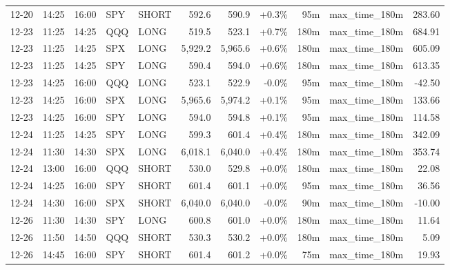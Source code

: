 \documentclass[11pt,a4paper,twoside]{article}
\begin{document}
\begin{center}
\begin{longtable}{>{\color{txtmain}}l l l l l r r r r >{\color{txtmain}}l r}
12-20 & 14:25 & 16:00 & SPY & SHORT & 592.6 & 590.9 & \textcolor{wingreen}{+0.3\%} & 95m & max\_time\_180m & \textcolor{wingreen}{283.60} \\
12-23 & 11:25 & 14:25 & QQQ & LONG & 519.5 & 523.1 & \textcolor{wingreen}{+0.7\%} & 180m & max\_time\_180m & \textcolor{wingreen}{684.91} \\
12-23 & 11:25 & 14:25 & SPX & LONG & 5,929.2 & 5,965.6 & \textcolor{wingreen}{+0.6\%} & 180m & max\_time\_180m & \textcolor{wingreen}{605.09} \\
12-23 & 11:25 & 14:25 & SPY & LONG & 590.4 & 594.0 & \textcolor{wingreen}{+0.6\%} & 180m & max\_time\_180m & \textcolor{wingreen}{613.35} \\
12-23 & 14:25 & 16:00 & QQQ & LONG & 523.1 & 522.9 & \textcolor{lossred}{-0.0\%} & 95m & max\_time\_180m & \textcolor{lossred}{-42.50} \\
12-23 & 14:25 & 16:00 & SPX & LONG & 5,965.6 & 5,974.2 & \textcolor{wingreen}{+0.1\%} & 95m & max\_time\_180m & \textcolor{wingreen}{133.66} \\
12-23 & 14:25 & 16:00 & SPY & LONG & 594.0 & 594.8 & \textcolor{wingreen}{+0.1\%} & 95m & max\_time\_180m & \textcolor{wingreen}{114.58} \\
12-24 & 11:25 & 14:25 & SPY & LONG & 599.3 & 601.4 & \textcolor{wingreen}{+0.4\%} & 180m & max\_time\_180m & \textcolor{wingreen}{342.09} \\
12-24 & 11:30 & 14:30 & SPX & LONG & 6,018.1 & 6,040.0 & \textcolor{wingreen}{+0.4\%} & 180m & max\_time\_180m & \textcolor{wingreen}{353.74} \\
12-24 & 13:00 & 16:00 & QQQ & SHORT & 530.0 & 529.8 & \textcolor{wingreen}{+0.0\%} & 180m & max\_time\_180m & \textcolor{wingreen}{22.08} \\
12-24 & 14:25 & 16:00 & SPY & SHORT & 601.4 & 601.1 & \textcolor{wingreen}{+0.0\%} & 95m & max\_time\_180m & \textcolor{wingreen}{36.56} \\
12-24 & 14:30 & 16:00 & SPX & SHORT & 6,040.0 & 6,040.0 & \textcolor{wingreen}{-0.0\%} & 90m & max\_time\_180m & \textcolor{lossred}{-10.00} \\
12-26 & 11:30 & 14:30 & SPY & LONG & 600.8 & 601.0 & \textcolor{wingreen}{+0.0\%} & 180m & max\_time\_180m & \textcolor{wingreen}{11.64} \\
12-26 & 11:50 & 14:50 & QQQ & SHORT & 530.3 & 530.2 & \textcolor{wingreen}{+0.0\%} & 180m & max\_time\_180m & \textcolor{wingreen}{5.09} \\
12-26 & 14:45 & 16:00 & SPY & SHORT & 601.4 & 601.2 & \textcolor{wingreen}{+0.0\%} & 75m & max\_time\_180m & \textcolor{wingreen}{19.93} \\

\end{longtable}
\end{center}
\end{document}
